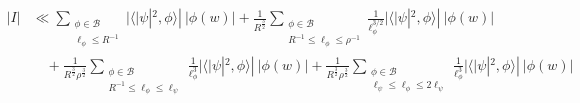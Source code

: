 \documentclass[11pt]{amsart}
\theoremstyle{definition}
\begin{document}
\begin{align}
    |I| &\ll \sum_{\substack{\phi \in \mathcal{B} \\ \ell_{\phi} \leq R^{-1}}} |\langle |\psi|^2, \phi\rangle | \: |\phi(w)| + \frac{1}{R^{\frac{3}{2}}} \sum_{\substack{\phi \in \mathcal{B} \\ R^{-1} \leq \ell_{\phi} \leq \rho^{-1}}} \frac{1}{\ell_{\phi}^{3/2}} |\langle |\psi|^2, \phi\rangle | \: |\phi(w)| \label{MainThmAllCenters-eq2} \\
    &\quad + \frac{1}{R^{\frac{3}{2}} \rho^{\frac{3}{2}}} \sum_{\substack{\phi \in \mathcal{B} \\ R^{-1} \leq \ell_{\phi} \leq \ell_{\psi}}} \frac{1}{\ell_{\phi}^3} |\langle |\psi|^2, \phi\rangle | \: |\phi(w)| + \frac{1}{R^{\frac{3}{2}} \rho^{\frac{3}{2}}} \sum_{\substack{\phi \in \mathcal{B} \\ \ell_{\psi} \leq \ell_{\phi} \leq 2\ell_{\psi}}} \frac{1}{\ell_{\phi}^3} |\langle |\psi|^2, \phi\rangle | \: |\phi(w)| \nonumber
\end{align}
\end{document}
